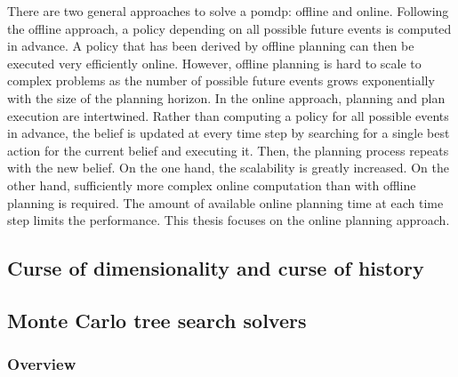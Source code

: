 

There are two general approaches to solve a \gls{pomdp}: offline and online. Following the offline approach, a policy depending on all possible future events is computed in advance. A policy that has been derived by offline planning can then be executed very efficiently online. However, offline planning is hard to scale to complex problems as the number of possible future events grows exponentially with the size of the planning horizon. In the online approach, planning and plan execution are intertwined. Rather than computing a policy for all possible events in advance, the belief is updated at every time step by searching for a single best action for the current belief and executing it. Then, the planning process repeats with the new belief. On the one hand, the scalability is greatly increased. On the other hand, sufficiently more complex online computation than with offline planning is required. The amount of available online planning time at each time step limits the performance. This thesis focuses on the online planning approach.

\subsection{Curse of dimensionality and curse of history}

\subsection{Monte Carlo tree search solvers}
\subsubsection{Overview}



